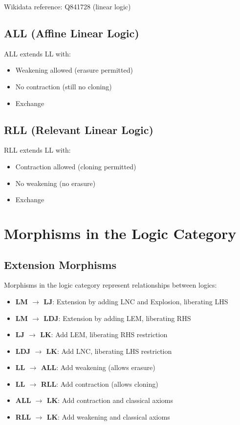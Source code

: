 Wikidata reference: Q841728 (linear logic)

\subsection*{ALL (Affine Linear Logic)}

ALL extends LL with:
\begin{itemize}
    \item Weakening allowed (erasure permitted)
    \item No contraction (still no cloning)
    \item Exchange
\end{itemize}

\subsection*{RLL (Relevant Linear Logic)}

RLL extends LL with:
\begin{itemize}
    \item Contraction allowed (cloning permitted)
    \item No weakening (no erasure)
    \item Exchange
\end{itemize}

\section*{Morphisms in the Logic Category}

\subsection*{Extension Morphisms}

Morphisms in the logic category represent relationships between logics:

\begin{itemize}
    \item \textbf{LM $\to$ LJ}: Extension by adding LNC and Explosion, liberating LHS
    \item \textbf{LM $\to$ LDJ}: Extension by adding LEM, liberating RHS
    \item \textbf{LJ $\to$ LK}: Add LEM, liberating RHS restriction
    \item \textbf{LDJ $\to$ LK}: Add LNC, liberating LHS restriction
    \item \textbf{LL $\to$ ALL}: Add weakening (allows erasure)
    \item \textbf{LL $\to$ RLL}: Add contraction (allows cloning)
    \item \textbf{ALL $\to$ LK}: Add contraction and classical axioms
    \item \textbf{RLL $\to$ LK}: Add weakening and classical axioms
\end{itemize}

